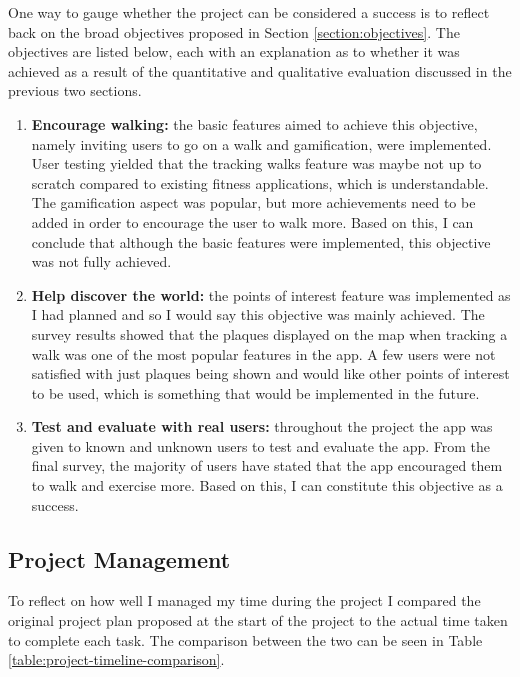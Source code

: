
One way to gauge whether the project can be considered a success is to reflect back on the broad objectives proposed in Section \ref{section:objectives}. The objectives are listed below, each with an explanation as to whether it was achieved as a result of the quantitative and qualitative evaluation discussed in the previous two sections.

\begin{enumerate}[label=\textbf{Obj \arabic*}]
  \item \textbf{Encourage walking:} the basic features aimed to achieve this objective, namely inviting users to go on a walk and gamification, were implemented. User testing yielded that the tracking walks feature was maybe not up to scratch compared to existing fitness applications, which is understandable. The gamification aspect was popular, but more achievements need to be added in order to encourage the user to walk more. Based on this, I can conclude that although the basic features were implemented, this objective was not fully achieved.

  \item \textbf{Help discover the world:} the points of interest feature was implemented as I had planned and so I would say this objective was mainly achieved. The survey results showed that the plaques displayed on the map when tracking a walk was one of the most popular features in the app. A few users were not satisfied with just plaques being shown and would like other points of interest to be used, which is something that would be implemented in the future.

  \item \textbf{Test and evaluate with real users:} throughout the project the app was given to known and unknown users to test and evaluate the app. From the final survey, the majority of users have stated that the app encouraged them to walk and exercise more. Based on this, I can constitute this objective as a success.
\end{enumerate}

\subsection{Project Management}

To reflect on how well I managed my time during the project I compared the original project plan proposed at the start of the project to the actual time taken to complete each task. The comparison between the two can be seen in Table \ref{table:project-timeline-comparison}.

